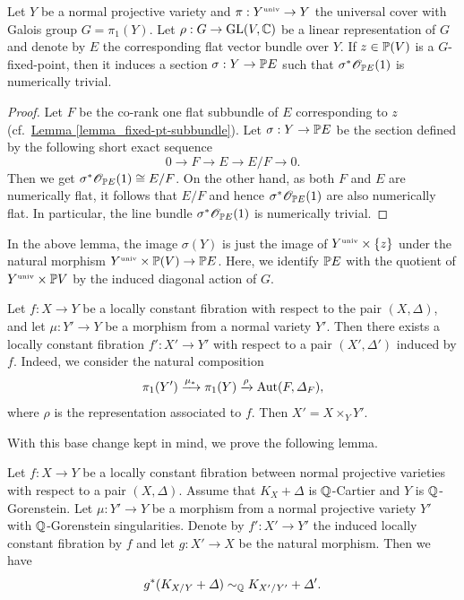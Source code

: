 \begin{lemme}
	\label{l.fixedpointflatsection}
	Let $Y$ be a normal projective variety and $\pi:Y^{\text{\tiny univ}}\rightarrow Y$  the universal cover with Galois group $G=\pi_1(Y)$. 
	Let $\rho:G\rightarrow \text{GL}(V,\mathbb C)$ be a linear representation of $G$ and denote by $E$ the corresponding flat vector bundle over $Y$. 
	If $z\in\mathbb P(V)$ is a $G$-fixed-point, then it induces a section $\sigma:Y\rightarrow \mathbb P E$   such that $\sigma^*\mathscr O_{\mathbb P E}(1)$ is numerically trivial. 
\end{lemme}

\begin{proof}
Let $F$ be  the co-rank one flat  subbundle of 
$E$ corresponding to $z$ (cf.~{\hyperref[lemma_fixed-pt-subbundle]{Lemma \ref*{lemma_fixed-pt-subbundle}}}).  
Let $\sigma:Y\rightarrow \mathbb P E$ be the section defined by the following short exact sequence
	\[
	0\rightarrow F\rightarrow E\rightarrow E/F\rightarrow 0.
	\]
	Then we get $\sigma^*\mathscr O_{\mathbb P E}(1)\cong E/F$. 
	On the other hand, as both $F$ and $E$ are numerically flat, it follows that $E/F$ and hence $\sigma^*\mathscr O_{\mathbb P E}(1)$ are also numerically flat.
In particular, the line bundle $\sigma^*\mathscr O_{\mathbb P E}(1)$ is numerically trivial.
\end{proof}

\begin{rmq}
	In the above lemma, the image $\sigma(Y)$ is just the image of $Y^{\text{\tiny univ}}\times \{z\}$ under the natural morphism $Y^{\text{\tiny univ}}\times \mathbb P(V)\rightarrow \mathbb P E$. 
	Here, we identify $\mathbb P E$ with  the quotient of $Y^{\text{\tiny univ}}\times \mathbb P V$ by the induced diagonal action of $G$.
\end{rmq}



Let $f:X\rightarrow Y$ be a locally constant fibration with respect to the pair $(X,\Delta)$, and let $\mu:Y'\rightarrow Y$ be a morphism from a normal variety $Y'$. 
Then there exists a locally constant fibration $f':X'\rightarrow Y'$ with respect to a pair $(X',\Delta')$ induced by $f$. Indeed, we consider the natural composition
\[
\pi_1(Y')\xrightarrow{\mu_*} \pi_1(Y) \xrightarrow{\rho} \operatorname{Aut}(F,\varDelta_F), 
\]
where $\rho$ is the representation associated to $f$. Then   $X' = X\times_{Y} Y'$.

With this base change kept in mind, we prove the following lemma.
\begin{lemme}
	\label{l.basechange}
	Let $f:X\rightarrow Y$ be a locally constant fibration between normal projective varieties with respect to a pair $(X,\Delta)$. Assume that $K_X+\Delta$ is $\mathbb Q$-Cartier and $Y$ is $\mathbb Q$-Gorenstein. Let $\mu:Y'\rightarrow Y$ be a morphism from a normal projective variety $Y'$ with $\mathbb Q$-Gorenstein singularities. 
	Denote by $f':X'\rightarrow Y'$ the induced locally constant fibration by $f$ and let $g:X'\rightarrow X$ be the natural   morphism. 
	Then we have
	\[
	g^*(K_{X/Y}+\varDelta) \sim_{\mathbb Q} K_{X'/Y'}+\varDelta'.
	\]
\end{lemme}

